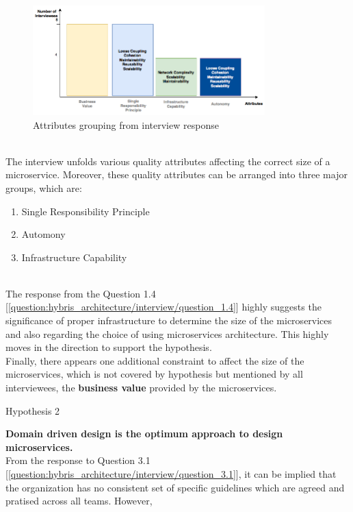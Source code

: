 \\
\begin{figure}[H]
\begin{center}
\includegraphics[width=0.8\textwidth]{figures/hybris-architecture-two}
\caption{Attributes grouping from interview response}
\label{fig:hybris_architecture/interview/attributes_grouping}
\end{center}
\end{figure}
\\
The interview unfolds various quality attributes affecting the correct size of a microservice. Moreover, these quality attributes can be arranged into three major groups, which are: \\
\begin{enumerate}
\item Single Responsibility Principle
\item Automony
\item Infrastructure Capability
\end{enumerate}
\\
The response from the Question 1.4 [\ref{question:hybris_architecture/interview/question_1.4}] highly suggests the significance of proper infrastructure to determine the size of the microservices and also regarding the choice of using microservices architecture.
This highly moves in the direction to support the hypothesis.\\
Finally, there appears one additional constraint to affect the size of the microservices, which is not covered by hypothesis but mentioned by all interviewees, the \textbf{business value} provided by the microservices.
\\
\begin{shaded} Hypothesis 2 \end{shaded}
\textbf{Domain driven design is the optimum approach to design microservices.}
\\
From the response to Question 3.1 [\ref{question:hybris_architecture/interview/question_3.1}], it can be implied that the organization has no consistent set of specific guidelines which are agreed and pratised across all teams. However,  
